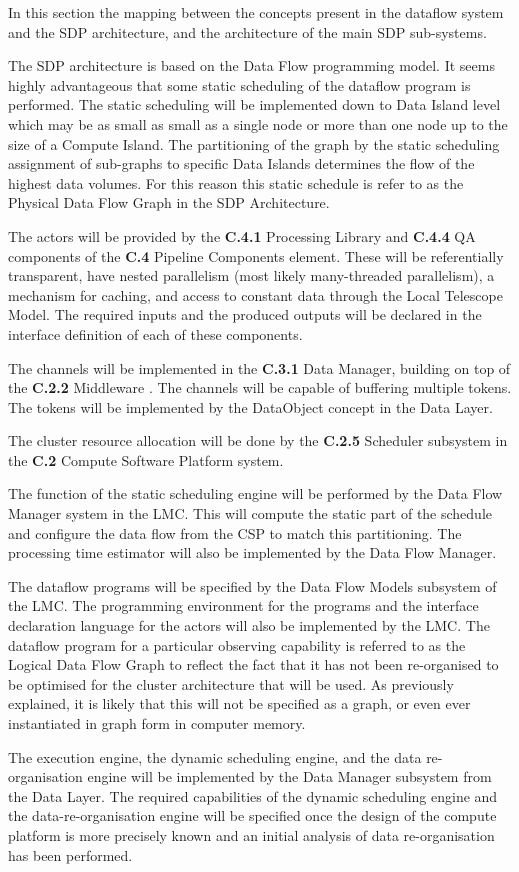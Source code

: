 \documentclass[11pt,a4paper]{article}
\begin{document}
In this section the mapping between the concepts present in the dataflow system and the SDP architecture, and the architecture of the main SDP sub-systems. 

The SDP architecture is based on the Data Flow programming model. It seems highly advantageous that some static scheduling of the dataflow program is performed. The static scheduling will be implemented down to Data Island level which may be as small as small as a single node or more than one node up to the size of a Compute Island. The partitioning of the graph by the static scheduling assignment of sub-graphs to specific Data Islands determines the flow of the highest data volumes. For this reason this static schedule is refer to as the Physical Data Flow Graph in the SDP Architecture.

The actors will be provided by the {\bf C.4.1} Processing Library and
{\bf C.4.4} QA components of the {\bf C.4} Pipeline Components
element. These will be referentially transparent, have nested
parallelism (most likely many-threaded parallelism), a mechanism for
caching, and access to constant data through the Local Telescope
Model. The required inputs and the produced outputs will be declared
in the interface definition of each of these components.

The channels will be implemented in the {\bf C.3.1} Data Manager,
building on top of the {\bf C.2.2} Middleware . The channels will be
capable of buffering multiple tokens. The tokens will be implemented
by the DataObject concept in the Data Layer.

The cluster resource allocation will be done by the {\bf C.2.5}
Scheduler subsystem in the {\bf C.2} Compute Software Platform system.

The function of the static scheduling engine will be performed by the
Data Flow Manager system in the LMC. This will compute the static part
of the schedule and configure the data flow from the CSP to match this
partitioning. The processing time estimator will also be implemented
by the Data Flow Manager.

The dataflow programs will be specified by the Data Flow Models
subsystem of the LMC.  The programming environment for the programs
and the interface declaration language for the actors will also be
implemented by the LMC.  The dataflow program for a particular
observing capability is referred to as the Logical Data Flow Graph to
reflect the fact that it has not been re-organised to be optimised for
the cluster architecture that will be used. As previously explained,
it is likely that this will not be specified as a graph, or even ever
instantiated in graph form in computer memory.

The execution engine, the dynamic scheduling engine, and the data
re-organisation engine will be implemented by the Data Manager
subsystem from the Data Layer. The required capabilities of the
dynamic scheduling engine and the data-re-organisation engine will be
specified once the design of the compute platform is more precisely
known and an initial analysis of data re-organisation has been
performed.

\clearpage
{}
%
\end{document}
